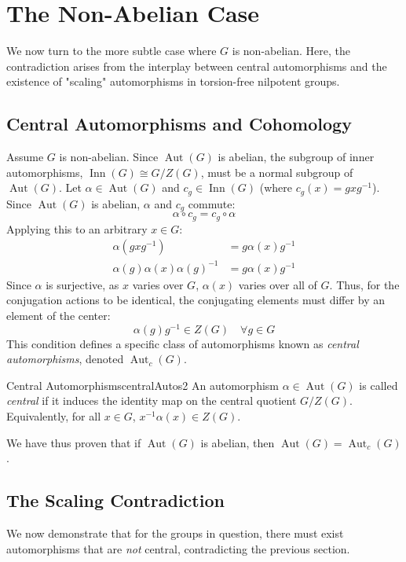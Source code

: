 \documentclass{book}
\newcommand{\Aut}{{\operatorname{Aut}}}
\newcommand{\Inn}{{\operatorname{Inn}}}
\begin{document}
\section{The Non-Abelian Case}

We now turn to the more subtle case where $G$ is non-abelian. Here, the contradiction arises from the interplay between central automorphisms and the existence of "scaling" automorphisms in torsion-free nilpotent groups.

\subsection{Central Automorphisms and Cohomology}

Assume $G$ is non-abelian. Since $\Aut(G)$ is abelian, the subgroup of inner automorphisms, $\Inn(G) \cong G/Z(G)$, must be a normal  subgroup of $\Aut(G)$.
Let $\alpha \in \Aut(G)$ and $c_g \in \Inn(G)$ (where $c_g(x) = gxg^{-1}$). Since $\Aut(G)$ is abelian, $\alpha$ and $c_g$ commute:
\[
    \alpha \circ c_g = c_g \circ \alpha
\]
Applying this to an arbitrary $x \in G$:
\begin{align*}
    \alpha(gxg^{-1}) &= g\alpha(x)g^{-1} \\
    \alpha(g)\alpha(x)\alpha(g)^{-1} &= g\alpha(x)g^{-1}
\end{align*}
Since $\alpha$ is surjective, as $x$ varies over $G$, $\alpha(x)$ varies over all of $G$. Thus, for the conjugation actions to be identical, the conjugating elements must differ by an element of the center:
\[
    \alpha(g)g^{-1} \in Z(G) \quad \forall g \in G
\]
This condition defines a specific class of automorphisms known as \emph{central automorphisms}, denoted $\Aut_c(G)$.
\begin{defn}{Central Automorphisms}{centralAutos2}
    An automorphism $\alpha \in \Aut(G)$ is called \emph{central} if it induces the identity map on the central quotient $G/Z(G)$. Equivalently, for all $x \in G$, $x^{-1}\alpha(x) \in Z(G)$.
\end{defn}
We have thus proven that if $\Aut(G)$ is abelian, then $\Aut(G) = \Aut_c(G)$.


\subsection{The Scaling Contradiction}

We now demonstrate that for the groups in question, there must exist automorphisms that are \emph{not} central, contradicting the previous section.
\end{document}
